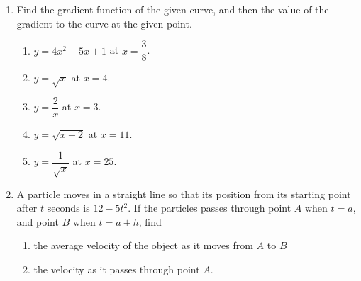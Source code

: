 \documentclass[11pt]{article}
\begin{document}
\begin{enumerate}
\item Find the gradient function of the given curve, and then the
value of the gradient to the curve at the given point.
\begin{enumerate}
\item \(y = 4x^2 - 5x + 1\) at \(x = \dfrac{3}{8}\).
\item \(y = \sqrt{x}\) at \(x = 4\).
\item \(y = \dfrac{2}{x}\) at \(x = 3\).
\item \(y = \sqrt{x - 2}\) at \(x = 11\).
\item \(y = \dfrac{1}{\sqrt{x}}\) at \(x = 25\).
\end{enumerate}
\item A particle moves in a straight line so that its position from
its starting point after \(t\) seconds is \(12-5t^2\). If the
particles passes through point \(A\) when \(t = a\), and point \(B\)
when \(t = a + h\), find
\begin{enumerate}
\item the average velocity of the object as it moves from \(A\) to
\(B\)
\item the velocity as it passes through point \(A\).
\end{enumerate}
\end{enumerate}
\end{document}
